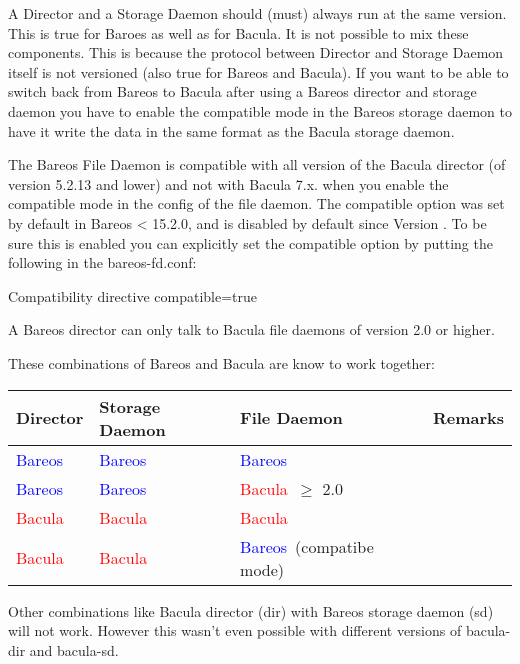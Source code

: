 A Director and a Storage Daemon should (must) always run at the same version.
This is true for Baroes as well as for Bacula.
It is not possible to mix these components.
This is because the protocol between Director and Storage Daemon itself is not versioned (also true for Bareos and Bacula).
If you want to be able to switch back from Bareos to Bacula after using a Bareos director and storage daemon
you have to enable the compatible mode in the Bareos storage daemon to have it write the data in the same
format as the Bacula storage daemon.

The Bareos File Daemon is compatible with all version of the Bacula director (of version 5.2.13 and lower)
and not with Bacula 7.x. when you enable the compatible mode in the config of the file daemon.
The compatible option was set by default in Bareos < 15.2.0, and is disabled by default since Version
.
To be sure this is enabled you can explicitly set the compatible option
by putting the following in the bareos-fd.conf:

\begin{bconfig}{Compatibility directive}
compatible=true
\end{bconfig}


A Bareos director can only talk to Bacula file daemons of version 2.0 or higher.

\newcommand{\bareoscolor}{\textcolor{blue}{Bareos\ }}
\newcommand{\baculacolor}{\textcolor{red}{Bacula\ }}


These combinations of Bareos and Bacula are know to work together:

\begin{tabular}[h]{|l|l|l|l|}
  \hline
  \textbf{Director} & \textbf{Storage Daemon} & \textbf{File Daemon} & \textbf{Remarks} \\
  \hline
  \hline
  \bareoscolor & \bareoscolor & \bareoscolor & \\
  \hline
  \bareoscolor & \bareoscolor & \baculacolor $\ge$ 2.0 & \\
  \hline
  \baculacolor & \baculacolor & \baculacolor & \\
  \hline
  \baculacolor & \baculacolor & \bareoscolor (compatibe mode) & \\
  \hline
\end{tabular}

Other combinations like Bacula director (dir) with Bareos storage daemon (sd) will not work. However this wasn't even possible with different versions of bacula-dir and bacula-sd.


